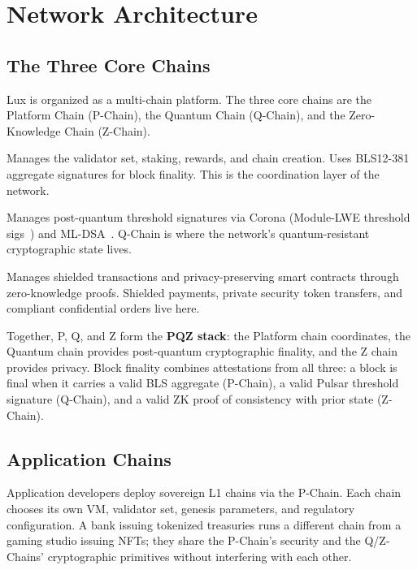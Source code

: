 \section{Network Architecture}


\subsection{The Three Core Chains}

Lux is organized as a multi-chain platform. The three core chains are
the Platform Chain (P-Chain), the Quantum Chain (Q-Chain), and the
Zero-Knowledge Chain (Z-Chain).

\begin{description}[nosep,leftmargin=0pt]
  \item[P-Chain (Platform)] Manages the validator set, staking,
        rewards, and chain creation. Uses BLS12-381 aggregate
        signatures for block finality. This is the coordination layer
        of the network.
  \item[Q-Chain (Quantum)] Manages post-quantum threshold signatures
        via Corona (Module-LWE threshold sigs~\cite{corona}) and
        ML-DSA~\cite{mldsa}. Q-Chain is where the network's
        quantum-resistant cryptographic state lives.
  \item[Z-Chain (Zero-Knowledge)] Manages shielded transactions and
        privacy-preserving smart contracts through zero-knowledge
        proofs. Shielded payments, private security token transfers,
        and compliant confidential orders live here.
\end{description}

Together, P, Q, and Z form the \textbf{PQZ stack}: the Platform chain
coordinates, the Quantum chain provides post-quantum cryptographic
finality, and the Z chain provides privacy. Block finality combines
attestations from all three: a block is final when it carries a
valid BLS aggregate (P-Chain), a valid Pulsar threshold signature
(Q-Chain), and a valid ZK proof of consistency with prior state
(Z-Chain).

\subsection{Application Chains}

Application developers deploy sovereign L1 chains via the P-Chain. Each chain chooses its own VM, validator set,
genesis parameters, and regulatory configuration. A bank issuing
tokenized treasuries runs a different chain from a gaming studio
issuing NFTs; they share the P-Chain's security and the Q/Z-Chains'
cryptographic primitives without interfering with each other.

